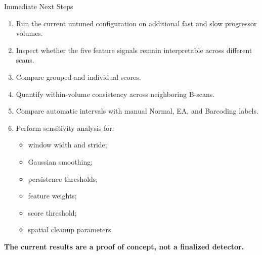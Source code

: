 \documentclass[aspectratio=169]{beamer}
\begin{document}
\begin{frame}{Immediate Next Steps}

\begin{enumerate}
    \item Run the current untuned configuration on additional fast and slow
    progressor volumes.
    \item Inspect whether the five feature signals remain interpretable across
    different scans.
    \item Compare grouped and individual scores.
    \item Quantify within-volume consistency across neighboring B-scans.
    \item Compare automatic intervals with manual Normal, EA, and Barcoding
    labels.
    \item Perform sensitivity analysis for:
    \begin{itemize}
        \item window width and stride;
        \item Gaussian smoothing;
        \item persistence thresholds;
        \item feature weights;
        \item score threshold;
        \item spatial cleanup parameters.
    \end{itemize}
\end{enumerate}

\vspace{0.3cm}

\begin{center}
\textbf{The current results are a proof of concept, not a finalized detector.}
\end{center}

\end{frame}
\end{document}

